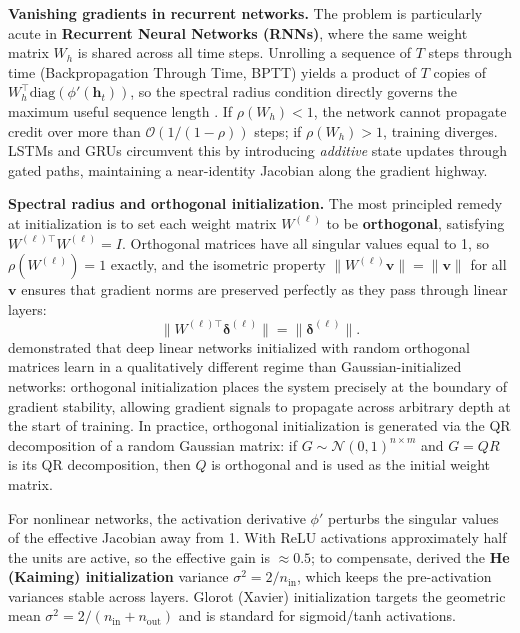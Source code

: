 \documentclass[11pt,a4paper]{article}
\begin{document}
	\textbf{Vanishing gradients in recurrent networks.} The problem is particularly acute in \textbf{Recurrent Neural Networks (RNNs)}, where the same weight matrix $W_h$ is shared across all time steps. Unrolling a sequence of $T$ steps through time (Backpropagation Through Time, BPTT) yields a product of $T$ copies of $W_h^\top \mathrm{diag}(\phi'(\mathbf{h}_t))$, so the spectral radius condition directly governs the maximum useful sequence length \parencite{bengio1994}. If $\rho(W_h) < 1$, the network cannot propagate credit over more than $\mathcal{O}(1/(1-\rho))$ steps; if $\rho(W_h) > 1$, training diverges. LSTMs and GRUs circumvent this by introducing \emph{additive} state updates through gated paths, maintaining a near-identity Jacobian along the gradient highway.

	\textbf{Spectral radius and orthogonal initialization.} The most principled remedy at initialization is to set each weight matrix $W^{(\ell)}$ to be \textbf{orthogonal}, satisfying $W^{(\ell)\top} W^{(\ell)} = I$. Orthogonal matrices have all singular values equal to 1, so $\rho(W^{(\ell)}) = 1$ exactly, and the isometric property $\|W^{(\ell)}\mathbf{v}\| = \|\mathbf{v}\|$ for all $\mathbf{v}$ ensures that gradient norms are preserved perfectly as they pass through linear layers:
	\begin{equation}
		\bigl\| W^{(\ell)\top} \boldsymbol{\delta}^{(\ell)} \bigr\| = \bigl\| \boldsymbol{\delta}^{(\ell)} \bigr\|.
	\end{equation}
	\textcite{saxe2013} demonstrated that deep linear networks initialized with random orthogonal matrices learn in a qualitatively different regime than Gaussian-initialized networks: orthogonal initialization places the system precisely at the boundary of gradient stability, allowing gradient signals to propagate across arbitrary depth at the start of training. In practice, orthogonal initialization is generated via the QR decomposition of a random Gaussian matrix: if $G \sim \mathcal{N}(0,1)^{n \times m}$ and $G = QR$ is its QR decomposition, then $Q$ is orthogonal and is used as the initial weight matrix.

	For nonlinear networks, the activation derivative $\phi'$ perturbs the singular values of the effective Jacobian away from 1. With ReLU activations approximately half the units are active, so the effective gain is $\approx 0.5$; to compensate, \textcite{he2015} derived the \textbf{He (Kaiming) initialization} variance $\sigma^2 = 2/n_{\mathrm{in}}$, which keeps the pre-activation variances stable across layers. Glorot (Xavier) initialization \parencite{glorot2010} targets the geometric mean $\sigma^2 = 2/(n_{\mathrm{in}}+n_{\mathrm{out}})$ and is standard for sigmoid/tanh activations.
\end{document}
